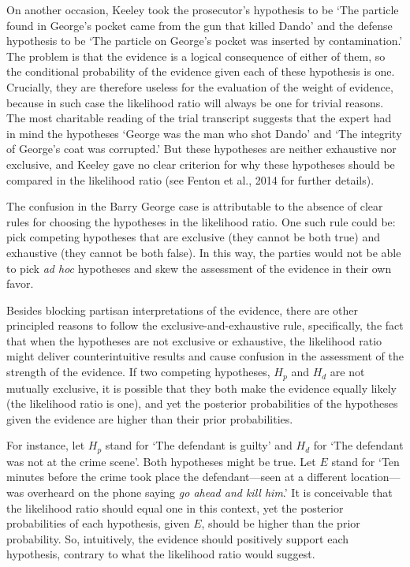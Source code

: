 \documentclass[10pt,dvipsnames,enabledeprecatedfontcommands]{scrartcl}
\begin{document}
On another occasion, Keeley took the prosecutor's hypothesis to be `The
particle found in George's pocket came from the gun that killed Dando'
and the defense hypothesis to be `The particle on George's pocket was
inserted by contamination.' The problem is that the evidence is a
logical consequence of either of them, so the conditional probability of
the evidence given each of these hypothesis is one. Crucially, they are
therefore useless for the evaluation of the weight of evidence, because
in such case the likelihood ratio will always be one for trivial
reasons. The most charitable reading of the trial transcript suggests
that the expert had in mind the hypotheses `George was the man who shot
Dando' and `The integrity of George's coat was corrupted.' But these
hypotheses are neither exhaustive nor exclusive, and Keeley gave no
clear criterion for why these hypotheses should be compared in the
likelihood ratio (see Fenton et al., 2014 for further details).

The confusion in the Barry George case is attributable to the absence of
clear rules for choosing the hypotheses in the likelihood ratio. One
such rule could be: pick competing hypotheses that are exclusive (they
cannot be both true) and exhaustive (they cannot be both false). In this
way, the parties would not be able to pick \textit{ad hoc} hypotheses
and skew the assessment of the evidence in their own favor.

Besides blocking partisan interpretations of the evidence, there are
other principled reasons to follow the exclusive-and-exhaustive rule,
specifically, the fact that when the hypotheses are not exclusive or
exhaustive, the likelihood ratio might deliver counterintuitive results
and cause confusion in the assessment of the strength of the evidence.
If two competing hypotheses, \(H_p\) and \(H_d\) are not mutually
exclusive, it is possible that they both make the evidence equally
likely (the likelihood ratio is one), and yet the posterior
probabilities of the hypotheses given the evidence are higher than their
prior probabilities.

For instance, let \(H_p\) stand for `The defendant is guilty' and
\(H_d\) for `The defendant was not at the crime scene'. Both hypotheses
might be true. Let \(E\) stand for `Ten minutes before the crime took
place the defendant---seen at a different location--- was overheard on
the phone saying \emph{go ahead and kill him}.' It is conceivable that
the likelihood ratio should equal one in this context, yet the posterior
probabilities of each hypothesis, given \(E\), should be higher than the
prior probability. So, intuitively, the evidence should positively
support each hypothesis, contrary to what the likelihood ratio would
suggest.
\end{document}
